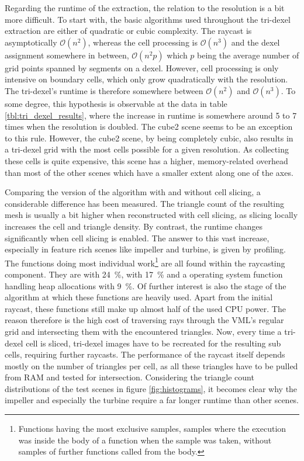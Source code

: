 Regarding the runtime of the extraction, the relation to the resolution is a bit more difficult.
To start with, the basic algorithms used throughout the tri-dexel extraction are either of quadratic or cubic complexity.
The raycast is asymptotically $\mathcal{O}(n^2)$, whereas the cell processing is $\mathcal{O}(n^3)$ and the dexel assignment somewhere in between, $\mathcal{O}(n^2p)$ which $p$ being the average number of grid points spanned by segments on a dexel.
However, cell processing is only intensive on boundary cells, which only grow quadratically with the resolution.
The tri-dexel's runtime is therefore somewhere between $\mathcal{O}(n^2)$ and $\mathcal{O}(n^3)$.
To some degree, this hypothesis is observable at the data in table \ref{tbl:tri_dexel_results}, where the increase in runtime is somewhere around 5 to 7 times when the resolution is doubled.
The cube2 scene seems to be an exception to this rule.
However, the cube2 scene, by being completely cubic, also results in a tri-dexel grid with the most cells possible for a given resolution.
As collecting these cells is quite expensive, this scene has a higher, memory-related overhead than most of the other scenes which have a smaller extent along one of the axes.

Comparing the version of the algorithm with and without cell slicing, a considerable difference has been measured.
The triangle count of the resulting mesh is usually a bit higher when reconstructed with cell slicing, as slicing locally increases the cell and triangle density.
By contrast, the runtime changes significantly when cell slicing is enabled.
The answer to this vast increase, especially in feature rich scenes like impeller and turbine, is given by profiling.
The functions doing most individual work\footnote{
	Functions having the most exclusive samples, \ie samples where the execution was inside the body of a function when the sample was taken, without samples of further functions called from the body.}
are all found within the raycasting component.
They are  with \SI{24}{\percent},  with \SI{17}{\percent} and a operating system function handling heap allocations with \SI{9}{\percent}.
Of further interest is also the stage of the algorithm at which these functions are heavily used.
Apart from the initial raycast, these functions still make up almost half of the used CPU power.
The reason therefore is the high cost of traversing rays through the VML's regular grid and intersecting them with the encountered triangles.
Now, every time a tri-dexel cell is sliced, tri-dexel images have to be recreated for the resulting sub cells, requiring further raycasts.
The performance of the raycast itself depends mostly on the number of triangles per cell, as all these triangles have to be pulled from RAM and tested for intersection.
Considering the triangle count distributions of the test scenes in figure \ref{fig:histograms}, it becomes clear why the impeller and especially the turbine require a far longer runtime than other scenes.

